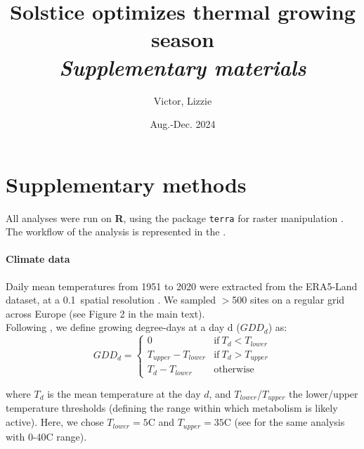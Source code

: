 \documentclass[11pt,letter]{article}
\title{Solstice optimizes thermal growing season\\\emph{Supplementary materials}}
\author{Victor, Lizzie}
\date{Aug.-Dec. 2024}
\begin{document}
\maketitle

\section*{Supplementary methods} %

All analyses were run on \textbf{\textsf{R}}, using the package \texttt{terra} for raster manipulation \citep{Hijmans2024}. The workflow of the analysis is represented in the .

\paragraph{Climate data}
Daily mean temperatures from 1951 to 2020 were extracted from the ERA5-Land dataset, at a 0.1\degree~spatial resolution \citep{MunozSabater2021}. We sampled $>$500 sites on a regular grid across Europe (see Figure 2 in the main text).\\
Following \citet{McMaster1997}, we define growing degree-days at a day d ($GDD_d$) as:
\begin{equation}
GDD_d =
\begin{cases}
    0 & \text{if}~T_d<T_{lower}\\
    T_{upper}-T_{lower} & \text{if}~T_d>T_{upper}\\
    T_d-T_{lower} & \text{otherwise}
\end{cases}       
\end{equation}

\noindent where $T_d$ is the mean temperature at the day $d$, and $T_{lower}$/$T_{upper}$ the lower/upper temperature thresholds (defining the range within which metabolism is likely active). Here, we chose $T_{lower}=5$\degree C and $T_{upper}=35$\degree C (see  for the same analysis with 0-40\degree C range). 
\end{document}
